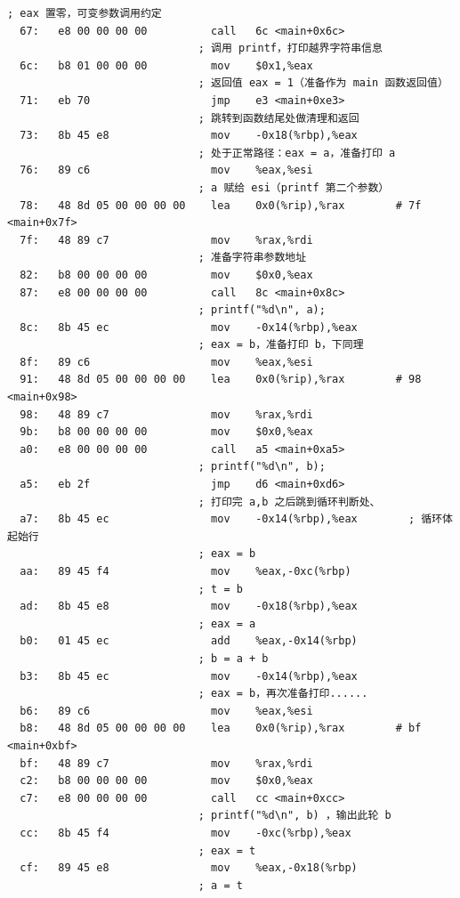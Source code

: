 \documentclass[UTF8,a4paper,10pt]{ctexart}
\begin{document}
\begin{lstlisting}[title=mainx86.o 反汇编结果与分析,frame=trbl,language={[x86masm]Assembler}]
                              ; eax 置零，可变参数调用约定
  67:   e8 00 00 00 00          call   6c <main+0x6c>
                              ; 调用 printf，打印越界字符串信息
  6c:   b8 01 00 00 00          mov    $0x1,%eax
                              ; 返回值 eax = 1（准备作为 main 函数返回值）
  71:   eb 70                   jmp    e3 <main+0xe3>
                              ; 跳转到函数结尾处做清理和返回
  73:   8b 45 e8                mov    -0x18(%rbp),%eax
                              ; 处于正常路径：eax = a，准备打印 a
  76:   89 c6                   mov    %eax,%esi
                              ; a 赋给 esi（printf 第二个参数）
  78:   48 8d 05 00 00 00 00    lea    0x0(%rip),%rax        # 7f <main+0x7f>
  7f:   48 89 c7                mov    %rax,%rdi
                              ; 准备字符串参数地址
  82:   b8 00 00 00 00          mov    $0x0,%eax
  87:   e8 00 00 00 00          call   8c <main+0x8c>
                              ; printf("%d\n", a);
  8c:   8b 45 ec                mov    -0x14(%rbp),%eax
                              ; eax = b，准备打印 b，下同理
  8f:   89 c6                   mov    %eax,%esi
  91:   48 8d 05 00 00 00 00    lea    0x0(%rip),%rax        # 98 <main+0x98>
  98:   48 89 c7                mov    %rax,%rdi
  9b:   b8 00 00 00 00          mov    $0x0,%eax
  a0:   e8 00 00 00 00          call   a5 <main+0xa5>
                              ; printf("%d\n", b);
  a5:   eb 2f                   jmp    d6 <main+0xd6>
                              ; 打印完 a,b 之后跳到循环判断处、
  a7:   8b 45 ec                mov    -0x14(%rbp),%eax        ; 循环体起始行
                              ; eax = b
  aa:   89 45 f4                mov    %eax,-0xc(%rbp)
                              ; t = b 
  ad:   8b 45 e8                mov    -0x18(%rbp),%eax
                              ; eax = a 
  b0:   01 45 ec                add    %eax,-0x14(%rbp)
                              ; b = a + b 
  b3:   8b 45 ec                mov    -0x14(%rbp),%eax
                              ; eax = b，再次准备打印......
  b6:   89 c6                   mov    %eax,%esi
  b8:   48 8d 05 00 00 00 00    lea    0x0(%rip),%rax        # bf <main+0xbf>
  bf:   48 89 c7                mov    %rax,%rdi
  c2:   b8 00 00 00 00          mov    $0x0,%eax
  c7:   e8 00 00 00 00          call   cc <main+0xcc>
                              ; printf("%d\n", b) ，输出此轮 b
  cc:   8b 45 f4                mov    -0xc(%rbp),%eax
                              ; eax = t 
  cf:   89 45 e8                mov    %eax,-0x18(%rbp)
                              ; a = t 

\end{lstlisting}
\end{document}

